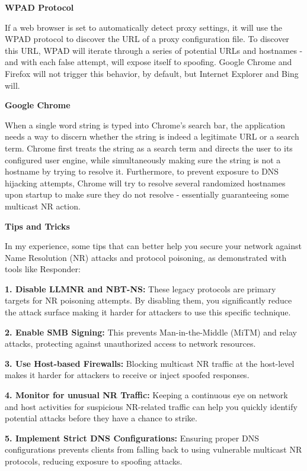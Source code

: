 \textbf{WPAD Protocol}

If a web browser is set to automatically detect proxy settings, it will use the WPAD protocol to discover the URL of a proxy configuration file. To discover this URL, WPAD will iterate through a series of potential URLs and hostnames - and with each false attempt, will expose itself to spoofing. Google Chrome and Firefox will not trigger this behavior, by default, but Internet Explorer and Bing will.

\textbf{Google Chrome}

When a single word string is typed into Chrome’s search bar, the application  needs a way to discern whether the string is indeed a legitimate URL or a search term. Chrome first treats the string as a search term and directs the user to its configured user engine, while simultaneously making sure the string is not a hostname by trying to resolve it. Furthermore, to prevent exposure to DNS hijacking attempts, Chrome will try to resolve several randomized hostnames upon startup to make sure they do not resolve - essentially guaranteeing some multicast NR action.

\textbf{Tips and Tricks}

In my experience, some tips that can better help you secure your network against Name Resolution (NR) attacks and protocol poisoning, as demonstrated with tools like Responder:

\textbf{1. Disable LLMNR and NBT-NS: }These legacy protocols are primary targets for NR poisoning attempts. By disabling them, you significantly reduce the attack surface making it harder for attackers to use this specific technique.

\textbf{2. Enable SMB Signing: }This prevents Man-in-the-Middle (MiTM) and relay attacks, protecting against unauthorized access to network resources.

\textbf{3. Use Host-based Firewalls: }Blocking multicast NR traffic at the host-level makes it harder for attackers to receive or inject spoofed responses.

\textbf{4. Monitor for unusual NR Traffic: }Keeping a continuous eye on network and host activities for suspicious NR-related traffic can help you quickly identify potential attacks before they have a chance to strike.

\textbf{5. Implement Strict DNS Configurations: }Ensuring proper DNS configurations prevents clients from falling back to using vulnerable multicast NR protocols, reducing exposure to spoofing attacks.

